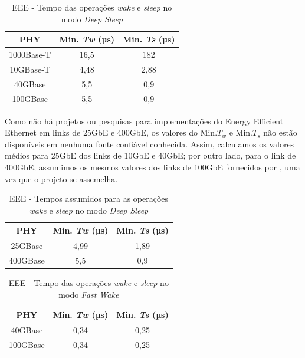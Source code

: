 \begin{table}[!htp]
\centering
\caption{EEE - Tempo das operações \emph{wake} e \emph{sleep} no modo \emph{Deep Sleep}}
\label{EEE wake and sleep operations times}
\def\arraystretch{1.2}
\begin{tabular}{c c c}
\hline
PHY & Min. \emph{Tw} (µs) &  Min. \emph{Ts} (µs)\\
\hline
1000Base-T & 16,5 & 182\\
10GBase-T & 4,48 & 2,88\\
40GBase & 5,5 & 0,9\\
100GBase & 5,5 & 0,9\\
\hline
\end{tabular}
\end{table}

Como não há projetos ou pesquisas para implementações do Energy Efficient Ethernet em links de 25GbE e 400GbE, os valores do Min.$T_w$ e  Min.$T_s$ não estão disponíveis em nenhuma fonte confiável conhecida. Assim, calculamos os valores médios para 25GbE dos links de 10GbE e 40GbE; por outro lado, para o link de 400GbE, assumimos os mesmos valores dos links de 100GbE fornecidos por \cite{6891095}, uma vez que o projeto se assemelha.


\begin{table}[!htp]
\centering
\caption{EEE - Tempos assumidos para as operações \emph{wake} e \emph{sleep} no modo \emph{Deep Sleep}}
\label{Generated EEE wake and sleep operations times}
\def\arraystretch{1.2}
\begin{tabular}{c c c}
\hline
PHY & Min. \emph{Tw} (µs) &  Min. \emph{Ts} (µs)\\
\hline
25GBase & 4,99 & 1,89\\
400GBase & 5,5 & 0,9\\
\hline
\end{tabular}
\end{table}

\begin{table}[!htp]
\centering
\caption{EEE - Tempo das operações \emph{wake} e \emph{sleep} no modo \emph{Fast Wake}}
\label{EEE wake and sleep operations times on Fast Wake Mode}
\def\arraystretch{1.2}
\begin{tabular}{c c c}
\hline
PHY & Min. \emph{Tw} (µs) &  Min. \emph{Ts} (µs)\\
\hline
40GBase & 0,34 & 0,25\\
100GBase & 0,34 & 0,25\\
\hline
\end{tabular}
\end{table}

